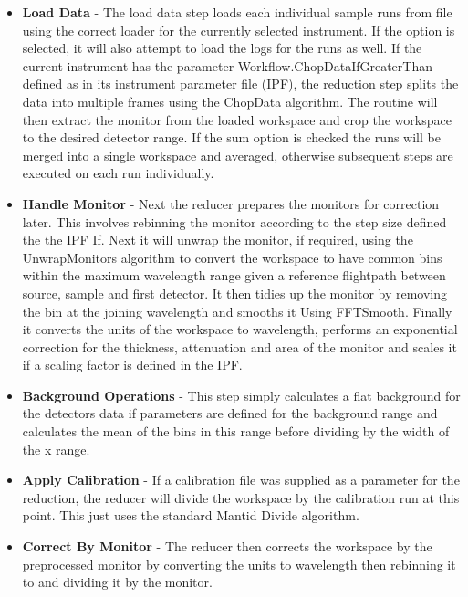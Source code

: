 \documentclass[paper=a4, fontsize=11pt]{scrartcl}	%
\numberwithin{equation}{section}															%
\numberwithin{figure}{section}																%
\numberwithin{table}{section}																%
\begin{document}
\begin{itemize}
\item \textbf{Load Data} - The load data step loads each individual sample runs from file using the correct loader for the currently selected instrument. If the option is selected, it will also attempt to load the logs for the runs as well. If the current instrument has the parameter Workflow.ChopDataIfGreaterThan defined as in its instrument parameter file (IPF), the reduction step splits the data into multiple frames using the ChopData algorithm. The routine will then extract the monitor from the loaded workspace and crop the workspace to the desired detector range. If the sum option is checked the runs will be merged into a single workspace and averaged, otherwise subsequent steps are executed on each run individually.

\item \textbf{Handle Monitor} - Next the reducer prepares the monitors for correction later. This involves rebinning the monitor according to the step size defined the the IPF If. Next it will unwrap the monitor, if required, using the UnwrapMonitors algorithm to convert the workspace to have common bins within the maximum wavelength range given a reference flightpath between source, sample and first detector. It then tidies up the monitor by removing the bin at the joining wavelength and smooths it Using FFTSmooth. Finally it converts the units of the workspace to wavelength, performs an exponential correction for the thickness, attenuation and area of the monitor and scales it if a scaling factor is defined in the IPF.

\item \textbf{Background Operations} - This step simply calculates a flat background for the detectors data if parameters are defined for the background range and calculates the mean of the bins in this range before dividing by the width of the x range.

\item \textbf{Apply Calibration} - If a calibration file was supplied as a parameter for the reduction, the reducer will divide the workspace by the calibration run at this point. This just uses the standard Mantid Divide algorithm.

\item \textbf{Correct By Monitor} - The reducer then corrects the workspace by the preprocessed monitor by converting the units to wavelength then rebinning it to and dividing it by the monitor.


\end{itemize}
\end{document}
